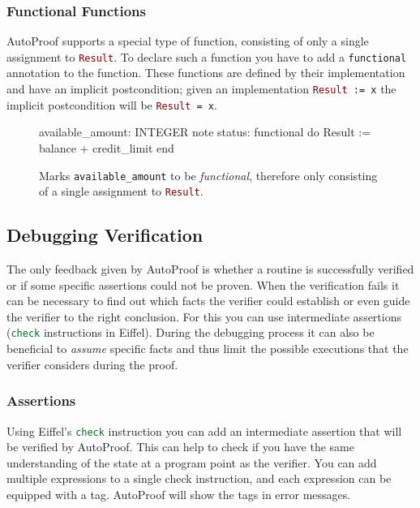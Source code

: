 \documentclass[a4paper,12pt]{article}
\newcommand{\AutoProof}{Auto\-Proof\xspace}
\newcommand{\e}[1]{\mbox{\lstinline[language=Eiffel]|#1|}}
\begin{document}
\subsubsection*{Functional Functions}

\AutoProof supports a special type of function, consisting of only a single assignment to \e{Result}. To declare such a function you have to add a \e{functional} annotation to the function. These functions are defined by their implementation and have an implicit postcondition; given an implementation \e{Result := x} the implicit postcondition will be \e{Result = x}.

\begin{figure}
\begin{erunning}
available_amount: INTEGER
	note
		status: functional
	do
		Result := balance + credit_limit
	end
\end{erunning}
\hspace{0.5cm}
\caption*{Marks \e{available_amount} to be \emph{functional}, therefore only consisting of a single assignment to \e{Result}.}
\end{figure}


\subsection{Debugging Verification}

The only feedback given by \AutoProof is whether a routine is successfully verified or if some specific assertions could not be proven. When the verification fails it can be necessary to find out which facts the verifier could establish or even guide the verifier to the right conclusion. For this you can use intermediate assertions (\e{check} instructions in Eiffel). During the debugging process it can also be beneficial to \emph{assume} specific facts and thus limit the possible executions that the verifier considers during the proof.

\subsubsection*{Assertions}

Using Eiffel's \e{check} instruction you can add an intermediate assertion that will be verified by \AutoProof. This can help to check if you have the same understanding of the state at a program point as the verifier. You can add multiple expressions to a single check instruction, and each expression can be equipped with a tag. \AutoProof will show the tags in error messages.
\end{document}

